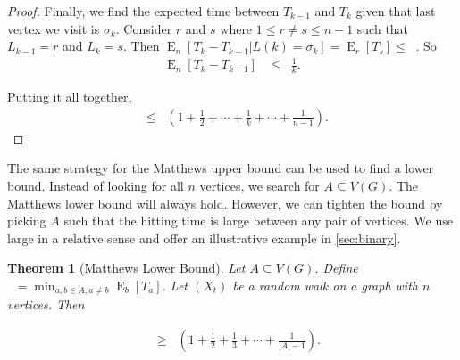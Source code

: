 \documentclass[12pt]{article}
\newtheorem{theorem}{Theorem}
\theoremstyle{definition}
\DeclareMathOperator{\E}{\mathrm{E}}		     %
\DeclareMathOperator{\tcov}{t_\textrm{cov}}      %
\DeclareMathOperator{\hit}{t_{\textrm{hit}}}     %
\DeclareMathOperator{\tmina}{t_\textrm{min}^A}   %
\begin{document}
\begin{proof}
Finally, we find the expected time between $T_{k-1}$ and $T_{k}$
given that last vertex we visit is $\sigma_k$.
Consider $r$ and $s$ where $1 \leq r \neq s \leq n-1$
such that $L_{k-1} = r$ and $L_k = s$.
Then $\E_n[T_k - T_{k-1} | L(k) = \sigma_k] = \E_r[T_s] \leq \hit$.
So
\begin{align}
\E_n[T_k - T_{k-1}] &\leq
\hit \frac{1}{k}. \nonumber 
\end{align}

Putting it all together,
\begin{align}
\tcov \leq \hit \left( 1+ \frac{1}{2} + \cdots + \frac{1}{k} 
+ \cdots + \frac{1}{n-1} \right). \nonumber
\end{align}
\end{proof}

The same strategy for the Matthews upper bound can be used
to find a lower bound.
Instead of looking for all $n$ vertices, we search
for $A \subseteq V(G)$.
The Matthews lower bound will always hold.
However, we can tighten the bound by picking $A$ such
that the hitting time is large between any pair of vertices.
We use large in a relative sense and 
offer an illustrative example in \cref{sec:binary}.

\begin{theorem}[Matthews Lower Bound]
Let $A \subseteq V(G)$. Define $\tmina = \min_{a,b\in A, a \neq b} \E_b[T_a]$.
Let $(X_t)$ be a random walk on a graph with $n$ vertices. Then \label{thm:matthews_low}
\end{theorem}
\begin{align}
\tcov &\geq \tmina \left(1 + \frac{1}{2} + \frac{1}{3} + \cdots +
\frac{1}{|A| -1} \right). \nonumber
\end{align}
\end{document}
